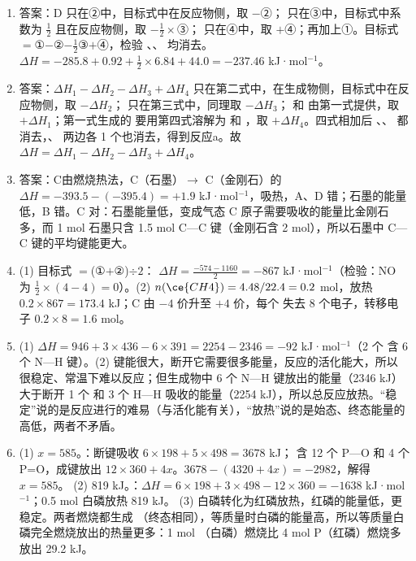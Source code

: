\documentclass[UTF8,a4paper,zihao=5,oneside,openany,fontset=none]{ctexbook}
\def\heiti{\CJKfamily{zhhei}}
\newenvironment{jiexilist}{\small\begin{enumerate}[label={\textbf{\arabic*}.},leftmargin=1.6em,itemsep=0.3em,topsep=0.2em]}{\end{enumerate}}
\newcommand{\ans}[1]{{\heiti 答案：}#1\quad}
\begin{document}
\begin{jiexilist}
\item \ans{D} 只在②中，目标式中在反应物侧，取 $-$②； 只在③中，目标式中系数为 $\frac12$ 且在反应物侧，取 $-\frac12\times$③； 只在④中，取 $+$④；再加上①。目标式 $=$①$-$②$-\frac12$③$+$④，检验 、、 均消去。$\Delta H=-285.8+0.92+\frac12\times6.84+44.0=-237.46$ kJ·mol$^{-1}$。
\item \ans{$\Delta H_1-\Delta H_2-\Delta H_3+\Delta H_4$} 只在第二式中，在生成物侧，目标式中在反应物侧，取 $-\Delta H_2$； 只在第三式中，同理取 $-\Delta H_3$； 和  由第一式提供，取 $+\Delta H_1$；第一式生成的  要用第四式溶解为  和 ，取 $+\Delta H_4$。四式相加后 、、 都消去，、 两边各 1 个也消去，得到反应a。故 $\Delta H=\Delta H_1-\Delta H_2-\Delta H_3+\Delta H_4$。
\item \ans{C}由燃烧热法，C（石墨）$\to$ C（金刚石）的 $\Delta H=-393.5-(-395.4)=+1.9$ kJ·mol$^{-1}$，吸热，A、D 错；石墨的能量低，B 错。C 对：石墨能量低，变成气态 C 原子需要吸收的能量比金刚石多，而 1 mol 石墨只含 1.5 mol C—C 键（金刚石含 2 mol），所以石墨中 C—C 键的平均键能更大。
\item (1) 目标式 $=$(①$+$②)$\div2$： $\Delta H=\frac{-574-1160}{2}=-867$ kJ·mol$^{-1}$（检验：NO 为 $\frac12\times(4-4)=0$）。(2) $n(\ce{CH4})=4.48/22.4=0.2$ mol，放热 $0.2\times867=173.4$ kJ；C 由 $-4$ 价升至 $+4$ 价，每个  失去 8 个电子，转移电子 $0.2\times8=1.6$ mol。
\item (1) $\Delta H=946+3\times436-6\times391=2254-2346=-92$ kJ·mol$^{-1}$（2 个  含 6 个 N—H 键）。(2)  键能很大，断开它需要很多能量，反应的活化能大，所以  很稳定、常温下难以反应；但生成物中 6 个 N—H 键放出的能量（2346 kJ）大于断开 1 个  和 3 个 H—H 吸收的能量（2254 kJ），所以总反应放热。“稳定”说的是反应进行的难易（与活化能有关），“放热”说的是始态、终态能量的高低，两者不矛盾。
\item (1) $x=585$。：断键吸收 $6\times198+5\times498=3678$ kJ； 含 12 个 P—O 和 4 个 P=O，成键放出 $12\times360+4x$。$3678-(4320+4x)=-2982$，解得 $x=585$。
(2) 819 kJ。：$\Delta H=6\times198+3\times498-12\times360=-1638$ kJ·mol$^{-1}$；0.5 mol 白磷放热 819 kJ。
(3) 白磷转化为红磷放热，红磷的能量低，更稳定。两者燃烧都生成 （终态相同），等质量时白磷的能量高，所以等质量白磷完全燃烧放出的热量更多：1 mol （白磷）燃烧比 4 mol P（红磷）燃烧多放出 29.2 kJ。

\end{jiexilist}
\end{document}
